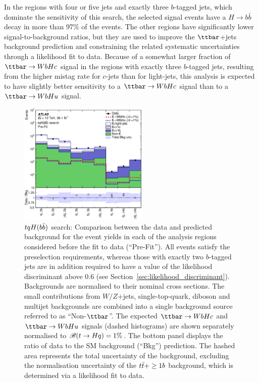In the regions with four or five jets and exactly three $b$-tagged jets, which dominate the sensitivity of this search, 
the selected signal events have a $H \to b\bar{b}$ decay in more than 97\% of the events.
The other regions have significantly lower signal-to-background ratios, but they are used to improve 
the $\ttbar$+jets background prediction and constraining the related systematic uncertainties
through a likelihood fit to data.  
Because of a somewhat larger fraction of $\Hc$ signal in the regions with exactly three $b$-tagged jets,
resulting from the higher mistag rate for $c$-jets than for light-jets,
this analysis is expected to have slightly better sensitivity to a $\Hc$ signal than to a $\Hu$ signal.

\begin{figure}[t]
\begin{center}
\includegraphics[width=0.55\textwidth]{figures/Hbb/fit/cH_plots/Summary.eps}
\caption{$tqH(b\bar{b})$ search: Comparison between the data and predicted background for the event yields in each of the analysis regions considered 
before the fit to data (``Pre-Fit''). All events satisfy the preselection requirements, whereas those with exactly two $b$-tagged jets are
in addition required to have a value of the likelihood discriminant above 0.6 (see Section~\ref{sec:likelihood_discriminant}).
Backgrounds are normalised to their nominal cross sections.
The small contributions from $W/Z$+jets,  single-top-quark, diboson and multijet backgrounds are combined into a single background source 
referred to as ``Non-$\ttbar$''. 
The expected $\Hc$ and $\Hu$ signals (dashed histograms) are shown separately normalised to $\mathscr{B}(t\to Hq)=1\%$.
The bottom panel displays the ratio of data to the SM background (``Bkg'') prediction. 
The hashed area represents the total uncertainty of the background, excluding the normalisation uncertainty of the $t\bar{t}+\geq1b$ background, 
which is determined via a likelihood fit to data.} 
\label{fig:Hbb_Summary}
\end{center}
\end{figure}

